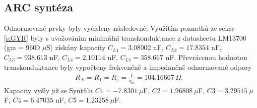 \subsection{ARC syntéza}\label{s:ARC}
\noindent Odnormované prvky byly vyčísleny následovně:
\noindent Využitím poznatků ze sekce \ref{s:GYR} byly s uvažováním minimální transkonduktance z datasheetu LM13700 (gm = 9600 $\mu$S) získány kapacity $C_{L1} = 3.08002 $ nF, $C_{L2} = 17.8354$ nF, $C_{L3} = 938.613 $ nF, $C_{L4} = 2.10114$ nF, $C_{L5} = 358.667$ nF.
\noindent Převrácenou hodnotou transkonduktance byly vypočteny frekvenčně a impedančně odnormované odpory
\begin{align}
R_N = R_1 = R_z = \frac{1}{g_m} = 104.16667 \ \Omega.
\end{align}
\noindent Kapacity vyšly již se Syntfilu $C1 = -7.8301 \  \mu$F, $C2 = 1.96808 \  \mu$F, $C3 = 3.29545 \  \mu$F, $C4 = 6.47035$ nF, $C5 = 1.23258 \  \mu$F.
\newpage
